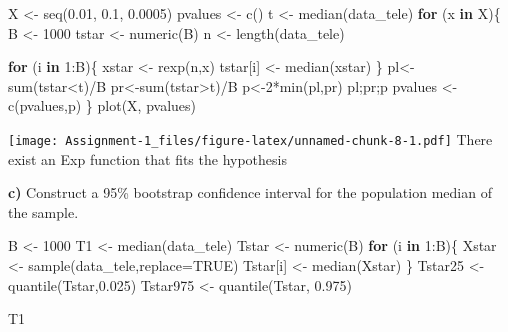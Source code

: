 \documentclass[
]{article}
\newenvironment{Shaded}{\begin{snugshade}}{\end{snugshade}}
\newcommand{\AttributeTok}[1]{\textcolor[rgb]{0.77,0.63,0.00}{#1}}
\newcommand{\ConstantTok}[1]{\textcolor[rgb]{0.00,0.00,0.00}{#1}}
\newcommand{\ControlFlowTok}[1]{\textcolor[rgb]{0.13,0.29,0.53}{\textbf{#1}}}
\newcommand{\DecValTok}[1]{\textcolor[rgb]{0.00,0.00,0.81}{#1}}
\newcommand{\FloatTok}[1]{\textcolor[rgb]{0.00,0.00,0.81}{#1}}
\newcommand{\FunctionTok}[1]{\textcolor[rgb]{0.00,0.00,0.00}{#1}}
\newcommand{\NormalTok}[1]{#1}
\newcommand{\OtherTok}[1]{\textcolor[rgb]{0.56,0.35,0.01}{#1}}
\newcommand{\SpecialCharTok}[1]{\textcolor[rgb]{0.00,0.00,0.00}{#1}}
\begin{document}
\begin{Shaded}
\begin{Highlighting}[]
\NormalTok{X }\OtherTok{\textless{}{-}} \FunctionTok{seq}\NormalTok{(}\FloatTok{0.01}\NormalTok{, }\FloatTok{0.1}\NormalTok{, }\FloatTok{0.0005}\NormalTok{)}
\NormalTok{pvalues }\OtherTok{\textless{}{-}} \FunctionTok{c}\NormalTok{()}
\NormalTok{t }\OtherTok{\textless{}{-}} \FunctionTok{median}\NormalTok{(data\_tele)}
\ControlFlowTok{for}\NormalTok{ (x }\ControlFlowTok{in}\NormalTok{ X)\{}
\NormalTok{  B }\OtherTok{\textless{}{-}} \DecValTok{1000}
\NormalTok{  tstar }\OtherTok{\textless{}{-}} \FunctionTok{numeric}\NormalTok{(B)}
\NormalTok{  n }\OtherTok{\textless{}{-}} \FunctionTok{length}\NormalTok{(data\_tele)}
  
  \ControlFlowTok{for}\NormalTok{ (i }\ControlFlowTok{in} \DecValTok{1}\SpecialCharTok{:}\NormalTok{B)\{}
\NormalTok{    xstar }\OtherTok{\textless{}{-}} \FunctionTok{rexp}\NormalTok{(n,x)}
\NormalTok{    tstar[i] }\OtherTok{\textless{}{-}} \FunctionTok{median}\NormalTok{(xstar)}
\NormalTok{  \}}
\NormalTok{  pl}\OtherTok{\textless{}{-}}\FunctionTok{sum}\NormalTok{(tstar}\SpecialCharTok{\textless{}}\NormalTok{t)}\SpecialCharTok{/}\NormalTok{B}
\NormalTok{  pr}\OtherTok{\textless{}{-}}\FunctionTok{sum}\NormalTok{(tstar}\SpecialCharTok{\textgreater{}}\NormalTok{t)}\SpecialCharTok{/}\NormalTok{B}
\NormalTok{  p}\OtherTok{\textless{}{-}}\DecValTok{2}\SpecialCharTok{*}\FunctionTok{min}\NormalTok{(pl,pr)}
\NormalTok{  pl;pr;p}
\NormalTok{  pvalues }\OtherTok{\textless{}{-}} \FunctionTok{c}\NormalTok{(pvalues,p)}
\NormalTok{\}}
\FunctionTok{plot}\NormalTok{(X, pvalues)}
\end{Highlighting}
\end{Shaded}

\texttt{[image: Assignment-1\_files/figure-latex/unnamed-chunk-8-1.pdf]}
There exist an Exp function that fits the hypothesis

\textbf{c)} Construct a 95\% bootstrap confidence interval for the
population median of the sample.

\begin{Shaded}
\begin{Highlighting}[]
\NormalTok{B }\OtherTok{\textless{}{-}} \DecValTok{1000}
\NormalTok{T1 }\OtherTok{\textless{}{-}} \FunctionTok{median}\NormalTok{(data\_tele)}
\NormalTok{Tstar }\OtherTok{\textless{}{-}} \FunctionTok{numeric}\NormalTok{(B)}
\ControlFlowTok{for}\NormalTok{ (i }\ControlFlowTok{in} \DecValTok{1}\SpecialCharTok{:}\NormalTok{B)\{}
\NormalTok{  Xstar }\OtherTok{\textless{}{-}} \FunctionTok{sample}\NormalTok{(data\_tele,}\AttributeTok{replace=}\ConstantTok{TRUE}\NormalTok{)}
\NormalTok{  Tstar[i] }\OtherTok{\textless{}{-}} \FunctionTok{median}\NormalTok{(Xstar)}
\NormalTok{\}}
\NormalTok{Tstar25 }\OtherTok{\textless{}{-}} \FunctionTok{quantile}\NormalTok{(Tstar,}\FloatTok{0.025}\NormalTok{)}
\NormalTok{Tstar975 }\OtherTok{\textless{}{-}} \FunctionTok{quantile}\NormalTok{(Tstar, }\FloatTok{0.975}\NormalTok{)}

\NormalTok{T1}
\end{Highlighting}
\end{Shaded}
\end{document}

